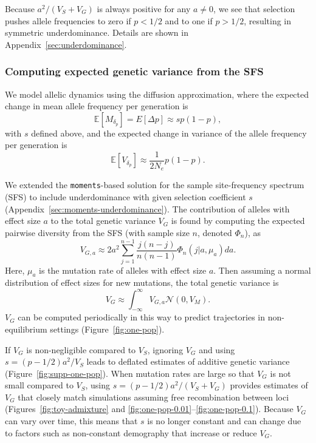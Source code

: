 \documentclass{article}
\newcommand{\E}{\mathbb{E}}
\newcommand{\moments}{\texttt{moments}\xspace}
\begin{document}
Because $a^2/(V_S+V_G)$ is always positive for any $a\not=0$, we see that
selection pushes allele frequencies to zero if $p<1/2$ and to one if $p>1/2$,
resulting in symmetric underdominance. Details are shown in
Appendix~\ref{sec:underdominance}.

\subsubsection*{Computing expected genetic variance from the SFS}

We model allelic dynamics using the diffusion approximation, where the expected
change in mean allele frequency per generation is
\[\E[M_{\delta_p}] = E[\Delta p] \approx s p(1-p),\]
with $s$ defined above, and the expected change in variance of the allele frequency per
generation is
\[\E[V_{\delta_p}] \approx \frac{1}{2N_e}p(1-p).\]


We extended the \moments-based solution for the sample site-frequency spectrum
(SFS) \citep{jouganous2017inferring} to include underdominance with given
selection coefficient $s$ (Appendix~\ref{sec:moments-underdominance}). The
contribution of alleles with effect size $a$ to the total genetic variance
$V_G$ is found by computing the expected pairwise diversity from the SFS (with
sample size $n$, denoted $\Phi_n$), as
\[V_{G,a} \approx 2a^2\sum_{j=1}^{n-1} \frac{j(n-j)}{n(n-1)} \Phi_n(j|a,\mu_a) da.\]
Here, $\mu_a$ is the mutation rate of alleles with effect size $a$. Then
assuming a normal distribution of effect sizes for new mutations, the total
genetic variance is
\[V_G \approx \int_{-\infty}^\infty V_{G,a}\mathcal{N}(0,V_M).\]
$V_G$ can be computed periodically in this way to predict trajectories in
non-equilibrium settings (Figure~\ref{fig:one-pop}).

If $V_G$ is non-negligible compared to $V_S$, ignoring $V_G$ and using
$s=(p-1/2)a^2/V_S$ leads to deflated estimates of additive genetic variance
(Figure~\ref{fig:supp-one-pop}). When mutation rates are large so that $V_G$ is
not small compared to $V_S$, using $s=(p-1/2)a^2/(V_S+V_G)$ provides estimates
of $V_G$ that closely match simulations assuming free recombination between
loci (Figures~\ref{fig:toy-admixture} and
\ref{fig:one-pop-0.01}--\ref{fig:one-pop-0.1}). Because $V_G$ can vary over
time, this means that $s$ is no longer constant and can change due to factors
such as non-constant demography that increase or reduce $V_G$.
\end{document}
